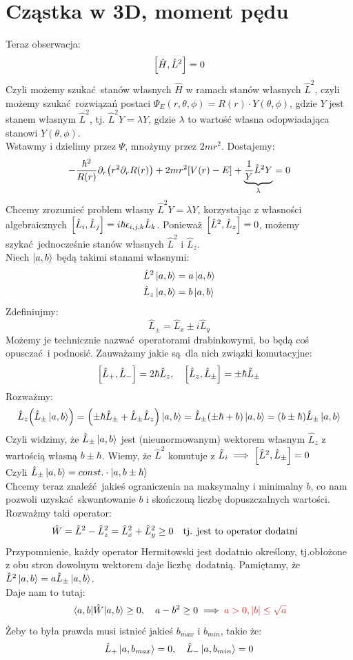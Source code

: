 \documentclass[12pt,a4paper]{report}
\newcommand{\subind}[2]{{\color{blue} #1\index{#2}}}
\newcommand{\pd}[1]{\partial_{#1}}
\newenvironment{lecture}[1]{\par\medskip
   \noindent\chapter{#1} \rmfamily}{\medskip}
\begin{document}
\begin{lecture}{Cząstka w 3D, moment pędu}
Teraz obserwacja:
\[
    \comm{\hat{H}}{\hat{L}^2} = 0
\]
Czyli możemy szukać stanów własnych $\hat{H}$ w ramach stanów własnych $\hat{L}^2$, czyli możemy szukać rozwiązań postaci $\Psi_E(r,\theta,\phi) = R(r)\cdot Y(\theta, \phi)$, gdzie $Y$ jest stanem własnym $\hat{L}^2$, tj. $\hat{L}^2 Y = \lambda Y$, gdzie $\lambda$ to wartość własna odopwiadająca stanowi $Y(\theta, \phi)$.\\
Wstawmy i dzielimy przez $\Psi$, mnożymy przez $2 m r^2$. Dostajemy:
\[
    -\frac{\hbar^2}{R(r)} \pd{r} \qty(r^2\pd{r}R(r)) + 2 m r^2\qty[V(r) - E] + \underbrace{\frac{1}{Y} \hat{L}^2 Y}_{\lambda} = 0
\]
Chcemy zrozumieć problem własny $\hat{L}^2 Y = \lambda Y$, korzystając z własności algebraicznych $\comm{\hat{L}_i}{\hat{L}_j} = i \hbar \epsilon_{i,j,k}\hat{L}_k$. Ponieważ $\comm{\hat{L}^2}{\hat{L}_z} = 0$, możemy szykać jednocześnie stanów własnych $\hat{L}^2$ i $\hat{L}_z$.\\
Niech $\ket{a,b}$ będą takimi stanami własnymi:
\begin{align*}
    \hat{L}^2 \ket{a,b} &= a \ket{a,b}\\
    \hat{L}_z \ket{a,b} &= b \ket{a,b}\\
\end{align*}
Zdefiniujmy:
\[
    \hat{L}_{\pm} = \hat{L}_x \pm i \hat{L}_y
\]
Możemy je technicznie nazwać operatorami drabinkowymi, bo będą coś opusczać i podnosić. Zauważamy jakie są dla nich \subind{związki komutacyjne}{Związek!Komutacyjny}:
\[
    \comm{\hat{L}_{+}}{\hat{L}_{-}} = 2 \hbar \hat{L}_z \qc \comm{\hat{L}_{z}}{\hat{L}_{\pm}} = \pm \hbar\hat{L}_{\pm}
\]
Rozważmy:
\[
    \hat{L}_z \qty(\hat{L}_{\pm}\ket{a,b}) = \qty(\pm \hbar \hat{L}_{\pm} + \hat{L}_{\pm}\hat{L}_z)\ket{a,b} = \hat{L}_{\pm}\qty(\pm\hbar + b)\ket{a,b} = \qty(b \pm \hbar) \hat{L}_{\pm}\ket{a,b}
\]
Czyli widzimy, że $\hat{L}_\pm\ket{a,b}$ jest (nieunormowanym) wektorem własnym $\hat{L}_z$ z wartością własną $b \pm \hbar$. Wiemy, że $\hat{L}^2$ komutuje z $\hat{L}_{i} \implies \comm{\hat{L}^2}{\hat{L}_\pm} = 0$\\
Czyli $\hat{L}_\pm \ket{a,b} = const. \cdot \ket{a,b\pm \hbar}$\\
Chcemy teraz znaleźć jakieś ograniczenia na maksymalny i minimalny $b$, co nam pozwoli uzyskać skwantowanie $b$ i skończoną liczbę dopuszczalnych wartości.\\
Rozważmy taki operator:
\[
    \hat{W} = \hat{L}^2 - \hat{L}_z^2 = \hat{L}_x^2 + \hat{L}_y^2 \geq 0 \qq{tj. jest to operator dodatni}
\]
Przypomnienie, każdy operator Hermitowski jest dodatnio określony, tj.obłożone z obu stron dowolnym wektorem daje liczbę dodatnią. Pamiętamy, że $\hat{L}^2 \ket{a,b} = a \hat{L}_\pm\ket{a,b}$.\\Daje nam to tutaj:
\[
    \mel{a,b}{\hat{W}}{a,b} \geq 0\qc a - b^2 \geq 0 \implies \color{BrickRed} a > 0, \abs{b} \leq \sqrt{a}
\]
Żeby to była prawda musi istnieć jakieś $b_{max}$ i $b_{min}$, takie że:
\begin{equation}
        \hat{L}_{+} \ket{a, b_{max}} = 0 \qc \hat{L}_{-} \ket{a, b_{min}} = 0 
        \label{eq:lec_14:L_pm}
\end{equation}
\end{lecture}
\end{document}
